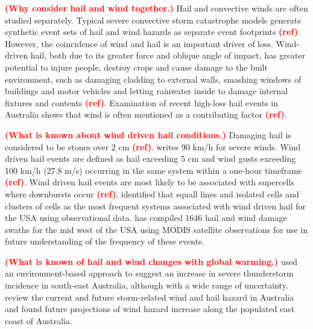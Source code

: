 \documentclass[]{agujournal2019}\usepackage[]{graphicx}\usepackage[]{xcolor}
\newcommand*{\todo}[1]{\textbf{\textcolor{red}{(#1)}}}
\newcommand*{\mref}{\todo{ref}}
\begin{document}
\todo{Why consider hail and wind together.} Hail and convective winds are often studied separately. Typical severe convective storm catastrophe models generate synthetic event sets of hail and wind hazards as separate event footprints \mref{}. However, the coincidence of wind and hail is an important driver of loss. Wind-driven hail, both due to its greater force and oblique angle of impact, has greater potential to injure people, destroy crops \cite{Changnon_JAMC_1967, Towery_JAMC_1976} and cause damage to the built environment, such as damaging cladding to external walls, smashing windows of buildings and motor vehicles and letting rainwater inside to damage internal fixtures and contents \mref{}. Examination of recent high-loss hail events in Australia shows that wind is often mentioned as a contributing factor \mref{}.


\todo{What is known about wind driven hail conditions.} Damaging hail is considered to be stones over 2 cm \mref{}. \cite{Allen_2018} writes 90 km/h for severe winds. Wind driven hail events are defined as hail exceeding 5 cm and wind gusts exceeding 100 km/h (27.8 m/s) occurring in the same system within a one-hour timeframe \mref{}. Wind driven hail events are most likely to be associated with supercells where downbursts occur \mref{}. \cite{Carletta_2010} identified that squall lines and isolated cells and clusters of cells as the most frequent systems associated with wind driven hail for the USA using observational data. \cite{Bell_WF_2023} has compiled 1646 hail and wind damage swaths for the mid west of the USA using MODIS satellite observations for use in future understanding of the frequency of these events.

\todo{What is known of hail and wind changes with global warming.} \cite{Allen_JC_2014} used an environment-based approach to suggest an increase in severe thunderstorm incidence in south-east Australia, although with a wide range of uncertainty. \cite{Walsh_CC_2016} review the current and future storm-related wind and hail hazard in Australia and found future projections of wind hazard increase along the populated east coast of Australia. 
\end{document}
